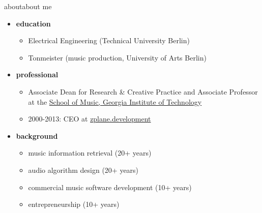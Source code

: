 \begin{frame}{about}{about me}
    \begin{itemize}
        \item   \textbf{education}
            \begin{itemize}
                \item   Electrical Engineering (Technical University Berlin)
                \item   Tonmeister (music production, University of Arts Berlin)
            \end{itemize}
        \bigskip
        \item   \textbf{professional}
            \begin{itemize}
                \item   Associate Dean for Research \& Creative Practice and Associate Professor at the \href{https://music.gatech.edu}{School of Music, Georgia Institute of Technology}
                \item   2000-2013: CEO at \href{https://www.zplane.de}{zplane.development}
            \end{itemize}
        \bigskip
        \item   \textbf{background}
            \begin{itemize}
                \item   music information retrieval (20+ years)
                \item   audio algorithm design (20+ years)
                \item   commercial music software development (10+ years)
                \item   entrepreneurship (10+ years)
            \end{itemize}
    \end{itemize}
    
\end{frame}
